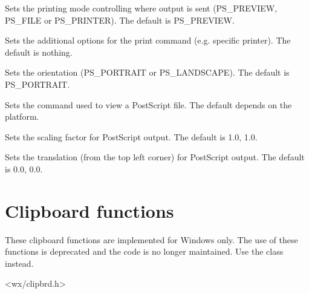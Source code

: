 
Sets the printing mode controlling where output is sent (PS\_PREVIEW, PS\_FILE or PS\_PRINTER).
The default is PS\_PREVIEW.



Sets the additional options for the print command (e.g. specific printer). The default is nothing.



Sets the orientation (PS\_PORTRAIT or PS\_LANDSCAPE). The default is PS\_PORTRAIT.



Sets the command used to view a PostScript file. The default depends on the platform.



Sets the scaling factor for PostScript output. The default is 1.0, 1.0.



Sets the translation (from the top left corner) for PostScript output. The default is 0.0, 0.0.

\section{Clipboard functions}\label{clipsboard}

These clipboard functions are implemented for Windows only. The use of these functions
is deprecated and the code is no longer maintained. Use the 
class instead.


<wx/clipbrd.h>



